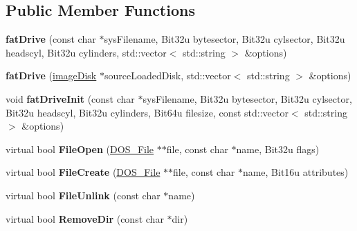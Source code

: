 \subsection*{Public Member Functions}
\begin{DoxyCompactItemize}
\item 
\hypertarget{classfatDrive_a7c013afd3b01a41b003be5d88229cbf9}{{\bfseries fat\-Drive} (const char $\ast$sys\-Filename, Bit32u bytesector, Bit32u cylsector, Bit32u headscyl, Bit32u cylinders, std\-::vector$<$ std\-::string $>$ \&options)}\label{classfatDrive_a7c013afd3b01a41b003be5d88229cbf9}

\item 
\hypertarget{classfatDrive_acee540d8f7ed9571f8d905920ba04615}{{\bfseries fat\-Drive} (\hyperlink{classimageDisk}{image\-Disk} $\ast$source\-Loaded\-Disk, std\-::vector$<$ std\-::string $>$ \&options)}\label{classfatDrive_acee540d8f7ed9571f8d905920ba04615}

\item 
\hypertarget{classfatDrive_a008ac73609cfbabcd2428ceaa1ee3a58}{void {\bfseries fat\-Drive\-Init} (const char $\ast$sys\-Filename, Bit32u bytesector, Bit32u cylsector, Bit32u headscyl, Bit32u cylinders, Bit64u filesize, const std\-::vector$<$ std\-::string $>$ \&options)}\label{classfatDrive_a008ac73609cfbabcd2428ceaa1ee3a58}

\item 
\hypertarget{classfatDrive_a2b7f5898cbfdf595b07b0c0c7da86c10}{virtual bool {\bfseries File\-Open} (\hyperlink{classDOS__File}{D\-O\-S\-\_\-\-File} $\ast$$\ast$file, const char $\ast$name, Bit32u flags)}\label{classfatDrive_a2b7f5898cbfdf595b07b0c0c7da86c10}

\item 
\hypertarget{classfatDrive_ac070fec3dd29d777417aae60bd7c6081}{virtual bool {\bfseries File\-Create} (\hyperlink{classDOS__File}{D\-O\-S\-\_\-\-File} $\ast$$\ast$file, const char $\ast$name, Bit16u attributes)}\label{classfatDrive_ac070fec3dd29d777417aae60bd7c6081}

\item 
\hypertarget{classfatDrive_a2269b9f78159262ff4432e83ad3eaad3}{virtual bool {\bfseries File\-Unlink} (const char $\ast$name)}\label{classfatDrive_a2269b9f78159262ff4432e83ad3eaad3}

\item 
\hypertarget{classfatDrive_a63690cccb8a79e395174725f3f178773}{virtual bool {\bfseries Remove\-Dir} (const char $\ast$dir)}\label{classfatDrive_a63690cccb8a79e395174725f3f178773}


\end{DoxyCompactItemize}
